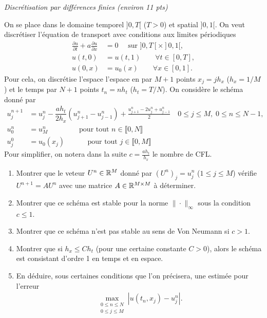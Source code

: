 \documentclass[12pt]{article}
\begin{document}
\newpage
\begin{exo}
  \textit{Discr\'etisation par diff\'erences finies (environ 11 pts)}

  On se place dans le domaine temporel $]0,T[$ ($T > 0$) et spatial $]0,1[$.
  On veut discr\'etiser l'\'equation de transport avec conditions aux limites p\'eriodiques
  \begin{align*}
    \frac{\partial u}{\partial t} + a \frac{\partial u}{\partial x}
    &= 0 \quad \text{ sur } ]0,T[ \times ]0,1[ ,
    \\
    u(t,0)
    &= u(t,1) \qquad \forall t \in [0,T] ,
    \\
    u(0,x)
    &= u_0(x) \qquad \forall x \in [0,1] .
  \end{align*}
  Pour cela, on discr\'etise l'espace l'espace en par $M+1$ points $x_j = jh_x$ ($h_x = 1/M$)
  et le temps par $N+1$ points $t_n = n h_t$ ($h_t = T/N$).
  On consid\`ere le sch\'ema donn\'e par
  \begin{align*}
    u_{j}^{n+1}
    &= u_j^n - \dfrac{a h_t}{2 h_x} ( u_{j+1}^n - u_{j-1}^n ) + \frac{u_{j+1}^n - 2 u_j^n + u_{j-1}^n}{2}
      \quad 0 \leq j \leq M, \; 0 \leq n \leq N-1 ,
    \\
    u_0^n
    &= u_M^n \qquad \qquad \text{ pour tout } n \in \llbracket 0, N \rrbracket
    \\
    u_j^0
    &= u_0(x_j) \qquad \;\;\;\! \text{ pour tout } j \in \llbracket 0,M \rrbracket
  \end{align*}
  Pour simplifier, on notera dans la suite $c = \frac{a h_t}{h_x}$ le nombre de CFL.

  \begin{enumerate}
  \item Montrer que le veteur $U^n \in \mathbb{R}^M$ donn\'e par $(U^n)_j = u_j^n$ ($1 \leq j \leq M$) v\'erifie
    $U^{n+1} = A U^n$ avec une matrice $A \in \mathbb{R}^{M \times M}$ \`a d\'eterminer.
  \item Montrer que ce sch\'ema est stable pour la norme $\| \cdot \|_{\infty}$
    sous la condition $c \leq 1$.
  \item Montrer que ce sch\'ema n'est pas stable au sens de Von Neumann si $c > 1$.
  \item Montrer que si $h_x \leq C h_t$ (pour une certaine constante $C>0$), alors le sch\'ema
    est consistant d'ordre 1 en temps et en espace.
  \item En d\'eduire, sous certaines conditions que l'on précisera, une estim\'ee pour l'erreur
    \begin{align*}
      \max_{\substack{0 \leq n \leq N \\ 0 \leq j \leq M}} |u(t_n,x_j) - u_j^n| .
    \end{align*}
    
  \end{enumerate}
\end{exo}
\end{document}
